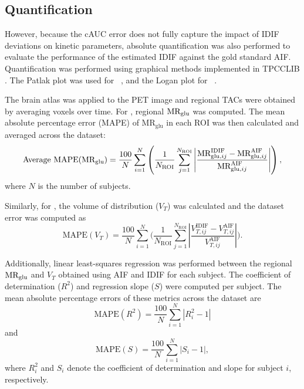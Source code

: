 \subsection{Quantification}
However, because the cAUC error does not fully capture the impact of IDIF deviations on kinetic parameters, absolute quantification was also performed to evaluate the performance of the estimated IDIF against the gold standard AIF.
Quantification was performed using graphical methods implemented in TPCCLIB \cite{oikonen2018tpcclib}.
The Patlak plot was used for \fdg\ \cite{patlak1983graphical}, and the Logan plot for \yohimbine\ \cite{logan1990graphical}.

The brain atlas was applied to the PET image and regional TACs were obtained by averaging voxels over time.
For \fdg, regional \(\text{MR}_{\text{glu}}\) was computed.
The mean absolute percentage error (MAPE) of \(\textrm{MR}_{\textrm{glu}}\) in each ROI was then calculated and averaged across the dataset:
\begin{equation}
	\text{Average MAPE}(\text{MR}_{\text{glu}})= \frac{100}{N} \sum_{i=1}^{N} \left( \frac{1}{N_{\text{ROI}}} \sum_{j=1}^{N_{\text{ROI}}} \left| \frac{\textrm{MR}_{\textrm{glu},ij}^{\textrm{IDIF}} - \textrm{MR}_{\textrm{glu},ij}^{\textrm{AIF}}}{\textrm{MR}_{\textrm{glu},ij}^{\textrm{AIF}}} \right| \right),
\end{equation}
where \(N\) is the number of subjects.

Similarly, for \yohimbine, the volume of distribution (\(V_T\)) was calculated and the dataset error was computed as
\begin{equation}
	\mathrm{MAPE}(V_T)
	= \frac{100}{N}
	\sum_{i=1}^{N}
	\biggl(
	\frac{1}{N_{\mathrm{ROI}}}
	\sum_{j=1}^{N_{\mathrm{ROI}}}
	\left|
	\frac{V_{T,ij}^{\mathrm{IDIF}} - V_{T,ij}^{\mathrm{AIF}}}
	{V_{T,ij}^{\mathrm{AIF}}}
	\right|
	\biggr).
\end{equation}

Additionally, linear least-squares regression was performed between the regional \(\text{MR}_{\text{glu}}\) and \(V_T\) obtained using AIF and IDIF for each subject.
The coefficient of determination (\(R^2\)) and regression slope (\(S\)) were computed per subject.
The mean absolute percentage errors of these metrics across the dataset are
\begin{equation}
	\text{MAPE}(R^2) = \frac{100}{N} \sum_{i=1}^{N} \left| R^2_i - 1 \right|
\end{equation}
and
\begin{equation}
	\text{MAPE}(S) = \frac{100}{N} \sum_{i=1}^{N} \left| S_i - 1 \right|,
\end{equation}
where \(R^2_i\) and \(S_i\) denote the coefficient of determination and slope for subject \(i\), respectively.

